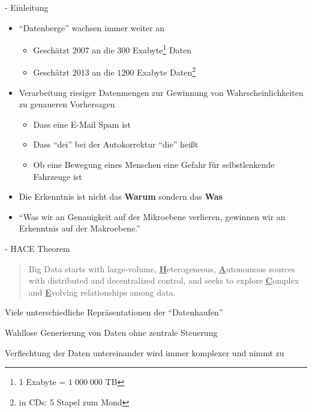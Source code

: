 \documentclass[fleqn,11pt,aspectratio=43]{beamer}
\begin{document}
\begin{frame}{\insertsectionhead - Einleitung \cite{mayer2014big} \cite{wu2014data}}
\begin{itemize}
\item \enquote{Datenberge} wachsen immer weiter an
\begin{itemize}
\item Geschätzt 2007 an die $300$ Exabyte\footnote{1 Exabyte = $1\;000\;000$ TB} Daten 
\item Geschätzt 2013 an die $1200$ Exabyte Daten\footnote{in CDs: 5 Stapel zum Mond}
\end{itemize}
\item Verarbeitung riesiger Datenmengen zur Gewinnung von Wahrscheinlichkeiten
zu genaueren Vorhersagen
\begin{itemize}
\item Dass eine E-Mail Spam ist
\item Dass \enquote{dei} bei der Autokorrektur \enquote{die} heißt
\item Ob eine Bewegung eines Menschen eine Gefahr für selbstlenkende Fahrzeuge ist
\end{itemize}
\item Die Erkenntnis ist nicht das \textbf{Warum} sondern das \textbf{Was} 
\item \enquote{Was wir an
Genauigkeit auf der Mikroebene verlieren, gewinnen wir an Erkenntnis
auf der Makroebene.} \cite{mayer2014big}
\end{itemize}
\end{frame}

\begin{frame}{\insertsectionhead - HACE Theorem \cite{wu2014data}}
\begin{quote}
Big Data starts with large-volume, \underline{\textbf{H}}eterogeneous, 
\underline{\textbf{A}}utonomous sources with distributed and decentralized control, 
and seeks to explore \underline{\textbf{C}}omplex and \underline{\textbf{E}}volving relationships 
among data.
\end{quote} %
\begin{description}\setlength{\itemsep}{15pt}
\item[{\parbox[t]{4cm}{Huge Heterogeneous Data:}}] {\parbox[t]{6.3cm}{Viele unterschiedliche Repräsentationen der \enquote{Datenhaufen}}}
\item[{\parbox[t]{4cm}{Autonomous Sources:}}] {\parbox[t]{6.3cm}{Wahllose Generierung von Daten ohne zentrale Steuerung}}
\item[{\parbox[t]{4cm}{Complex and Evolving Relationships:}}] {\parbox[t]{6.3cm}{Verflechtung der Daten untereinander wird immer komplexer und nimmt zu}}
\end{description}
\end{frame}
\end{document}
